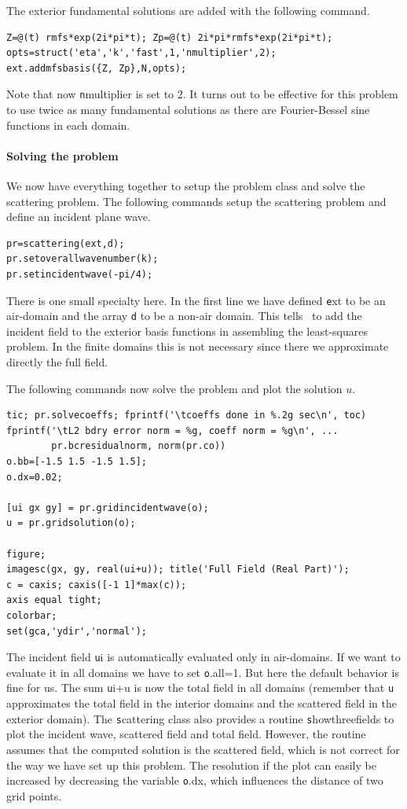 The exterior fundamental solutions are added with the following command.
\begin{verbatim}
Z=@(t) rmfs*exp(2i*pi*t); Zp=@(t) 2i*pi*rmfs*exp(2i*pi*t);
opts=struct('eta','k','fast',1,'nmultiplier',2);
ext.addmfsbasis({Z, Zp},N,opts);
\end{verbatim}
Note that now {\texttt nmultiplier} is set to $2$. It turns out to be
effective for this problem to use twice as many fundamental solutions
as there are Fourier-Bessel sine functions in each domain.

\paragraph{Solving the problem}
We now have everything together to setup the problem class and solve
the scattering problem. The following commands setup the scattering
problem and define an incident plane wave.
\begin{verbatim}
pr=scattering(ext,d);
pr.setoverallwavenumber(k);
pr.setincidentwave(-pi/4);
\end{verbatim}
There is one small specialty here. In the first line we have 
defined {\texttt ext} to be an air-domain and the array {\texttt d} to
be a non-air domain. This tells \mpspack\ to add the incident field to
the exterior basis functions in assembling the least-squares
problem. In the finite domains this is not necessary since there we
approximate directly the full field.



The following commands now solve the problem and plot the solution
$u$.
\begin{verbatim}
tic; pr.solvecoeffs; fprintf('\tcoeffs done in %.2g sec\n', toc)
fprintf('\tL2 bdry error norm = %g, coeff norm = %g\n', ...
        pr.bcresidualnorm, norm(pr.co))
o.bb=[-1.5 1.5 -1.5 1.5];
o.dx=0.02;

[ui gx gy] = pr.gridincidentwave(o);
u = pr.gridsolution(o);

figure;
imagesc(gx, gy, real(ui+u)); title('Full Field (Real Part)');
c = caxis; caxis([-1 1]*max(c));
axis equal tight;
colorbar;
set(gca,'ydir','normal'); 
\end{verbatim}
The incident field {\texttt ui} 
is automatically evaluated only in air-domains. If
we want to evaluate it in all domains we have to set {\texttt
  o.all=1}. But here the default behavior is fine for us. The sum
{\texttt ui+u} is now the total field in all domains (remember that
{\texttt u} approximates the total field in the interior domains
and the scattered field in the exterior domain). The {\texttt
  scattering} class also provides a routine {\texttt showthreefields}
to plot the incident wave, scattered field and total field. However,
the routine assumes that the computed solution is the scattered field,
which is not correct for the way we have set up this problem. The
resolution if the plot can easily be increased by decreasing the
variable {\texttt o.dx}, which influences the distance of two grid points.


